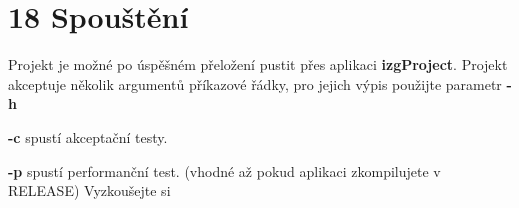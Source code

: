 \chapter{18 Spouštění}
\hypertarget{p18_spousteni}{}\label{p18_spousteni}
Projekt je možné po úspěšném přeložení pustit přes aplikaci {\bfseries{izg\+Project}}. Projekt akceptuje několik argumentů příkazové řádky, pro jejich výpis použijte parametr {\bfseries{ -\/h }}
\begin{DoxyItemize}
\item {\bfseries{-\/c}} spustí akceptační testy.
\item {\bfseries{-\/p}} spustí performanční test. (vhodné až pokud aplikaci zkompilujete v RELEASE) Vyzkoušejte si 
\begin{DoxyCode}{0}

\end{DoxyCode}
 
\end{DoxyItemize}